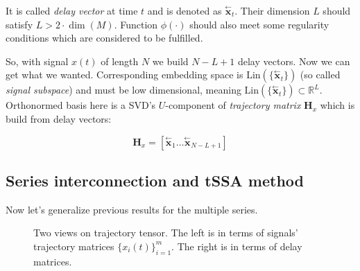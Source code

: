 \documentclass[referee, pdflatex, sn-mathphys-num]{sn-jnl}
\theoremstyle{definition}
\theoremstyle{plain}
\newcommand{\delayV}[1]{\overset{\leftarrow}{\mathbf{x}}_{#1}}
\begin{document}
	It is called \emph{delay vector} at time $ t $ and is denoted as $ \delayV{t} $. Their dimension $ L $ should satisfy $ L > 2 \cdot \dim(M) $. Function $ \phi(\cdot) $ should also meet some regularity conditions which are considered to be fulfilled.
	
	So, with signal $ x(t) $ of length $ N $ we build $ N - L + 1 $ delay vectors. Now we can get what we wanted. Corresponding embedding space is $ \text{Lin}(\{\delayV{t}\}) $ (so called \emph{signal subspace}) and must be low dimensional, meaning $ \text{Lin}(\{\delayV{t}\}) \subset \mathbb{R}^L $. Orthonormed basis here is a SVD's $ U $-component of \emph{trajectory matrix} $ \mathbf{H}_x $ which is build from delay vectors:
	
	\[
		\mathbf{H}_x = [ \delayV{1} \ldots  \delayV{N - L + 1}]
	\]
	
	\subsection{Series interconnection and tSSA method}\label{sec:tssa_method}
	
	Now let's generalize previous results for the multiple series.
	
	\begin{figure}[h]
		\centering
		
		\caption{Two views on trajectory tensor. The left is in terms of signals' trajectory matrices $ \{x_i(t)\}_{i=1}^m $. The right is in terms of delay matrices.}\label{pic:traj_tensor}
	\end{figure}
	
\end{document}
